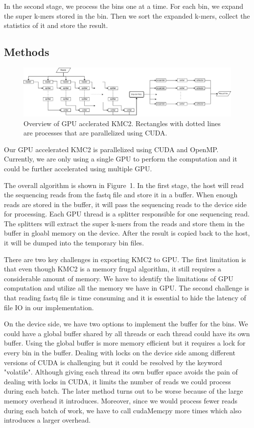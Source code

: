 \documentclass{bioinfo}
\begin{document}
In the second stage, we process the bins one at a time. For each bin, we expand the super k-mers stored in the bin. Then we sort the expanded k-mers, collect the statistics of it and store the result.
\begin{methods}
\section{Methods}

\begin{figure}[t]
	\centering
	\includegraphics[scale=0.5]{kmc2.png}
	\caption{Overview of GPU acclerated KMC2. Rectangles with dotted lines are processes that are parallelized using CUDA.}\label{fig:01}
\end{figure}

\enlargethispage{6pt}
Our GPU accelerated KMC2 is parallelized using CUDA and OpenMP. Currently, we are only using a single GPU to perform the computation and it could be further accelerated using multiple GPU.

The overall algorithm is shown in Figure~1\vphantom{\ref{fig:01}}.
In the first stage, the host will read the sequencing reads from the fastq file and store it in a buffer.
When enough reads are stored in the buffer, it will pass the sequencing reads to the device side for processing.
Each GPU thread is a splitter responsible for one sequencing read. The splitters will extract the super k-mers from the reads and store them in the buffer in gloabl memory on the device. 
After the result is copied back to the host, it will be dumped into the temporary bin files.

There are two key challenges in exporting KMC2 to GPU. 
The first limitation is that even though KMC2 is a memory frugal algorithm, it still requires a considerable amount of memory. 
We have to identify the limitations of GPU computation and utilize all the memory we have in GPU. 
The second challenge is that reading fastq file is time consuming and it is essential to hide the latency of file IO in our implementation.

On the device side, we have two options to implement the buffer for the bins. We could have a global buffer shared by all threads or each thread could have its own buffer.
Using the global buffer is more memory efficient but it requires a lock for every bin in the buffer.
Dealing with locks on the device side among different versions of CUDA is challenging but it could be resolved by the keyword "volatile".
Although giving each thread its own buffer space avoids the pain of dealing with locks in CUDA, it limits the number of reads we could process during each batch.
The later method turns out to be worse because of the large memory overhead it introduces. 
Moreover, since we would process fewer reads during each batch of work, we have to call cudaMemcpy more times which also introduces a larger overhead.


\end{methods}
\end{document}

